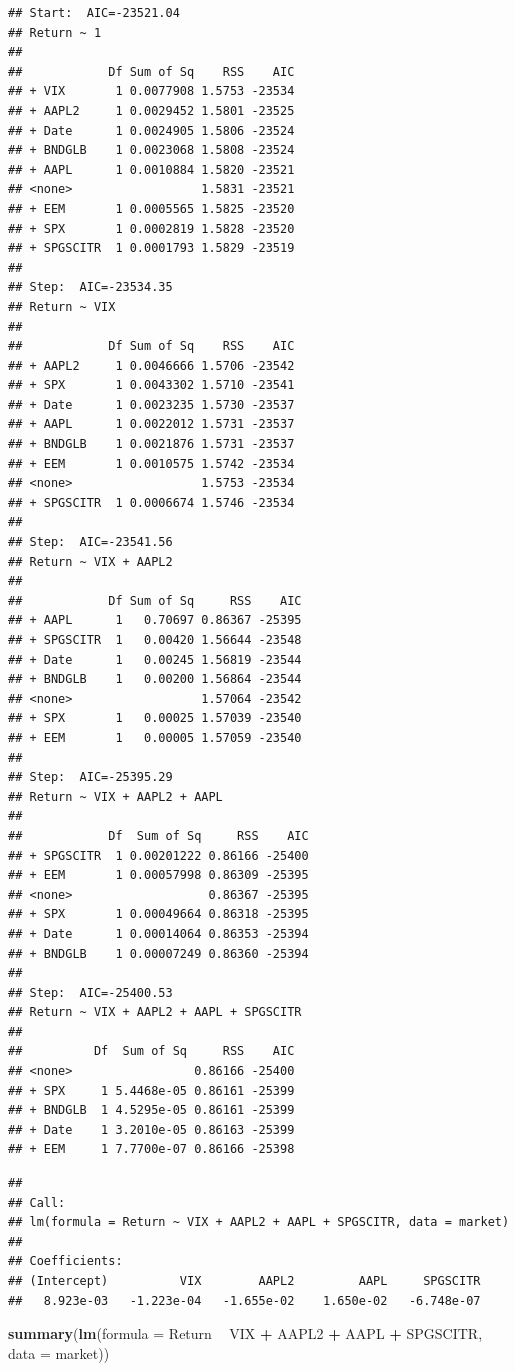 \documentclass[]{article}
\newenvironment{Shaded}{\begin{snugshade}}{\end{snugshade}}
\newcommand{\KeywordTok}[1]{\textcolor[rgb]{0.13,0.29,0.53}{\textbf{#1}}}
\newcommand{\DataTypeTok}[1]{\textcolor[rgb]{0.13,0.29,0.53}{#1}}
\newcommand{\StringTok}[1]{\textcolor[rgb]{0.31,0.60,0.02}{#1}}
\newcommand{\OperatorTok}[1]{\textcolor[rgb]{0.81,0.36,0.00}{\textbf{#1}}}
\newcommand{\NormalTok}[1]{#1}
\begin{document}
\begin{verbatim}
## Start:  AIC=-23521.04
## Return ~ 1
## 
##            Df Sum of Sq    RSS    AIC
## + VIX       1 0.0077908 1.5753 -23534
## + AAPL2     1 0.0029452 1.5801 -23525
## + Date      1 0.0024905 1.5806 -23524
## + BNDGLB    1 0.0023068 1.5808 -23524
## + AAPL      1 0.0010884 1.5820 -23521
## <none>                  1.5831 -23521
## + EEM       1 0.0005565 1.5825 -23520
## + SPX       1 0.0002819 1.5828 -23520
## + SPGSCITR  1 0.0001793 1.5829 -23519
## 
## Step:  AIC=-23534.35
## Return ~ VIX
## 
##            Df Sum of Sq    RSS    AIC
## + AAPL2     1 0.0046666 1.5706 -23542
## + SPX       1 0.0043302 1.5710 -23541
## + Date      1 0.0023235 1.5730 -23537
## + AAPL      1 0.0022012 1.5731 -23537
## + BNDGLB    1 0.0021876 1.5731 -23537
## + EEM       1 0.0010575 1.5742 -23534
## <none>                  1.5753 -23534
## + SPGSCITR  1 0.0006674 1.5746 -23534
## 
## Step:  AIC=-23541.56
## Return ~ VIX + AAPL2
## 
##            Df Sum of Sq     RSS    AIC
## + AAPL      1   0.70697 0.86367 -25395
## + SPGSCITR  1   0.00420 1.56644 -23548
## + Date      1   0.00245 1.56819 -23544
## + BNDGLB    1   0.00200 1.56864 -23544
## <none>                  1.57064 -23542
## + SPX       1   0.00025 1.57039 -23540
## + EEM       1   0.00005 1.57059 -23540
## 
## Step:  AIC=-25395.29
## Return ~ VIX + AAPL2 + AAPL
## 
##            Df  Sum of Sq     RSS    AIC
## + SPGSCITR  1 0.00201222 0.86166 -25400
## + EEM       1 0.00057998 0.86309 -25395
## <none>                   0.86367 -25395
## + SPX       1 0.00049664 0.86318 -25395
## + Date      1 0.00014064 0.86353 -25394
## + BNDGLB    1 0.00007249 0.86360 -25394
## 
## Step:  AIC=-25400.53
## Return ~ VIX + AAPL2 + AAPL + SPGSCITR
## 
##          Df  Sum of Sq     RSS    AIC
## <none>                 0.86166 -25400
## + SPX     1 5.4468e-05 0.86161 -25399
## + BNDGLB  1 4.5295e-05 0.86161 -25399
## + Date    1 3.2010e-05 0.86163 -25399
## + EEM     1 7.7700e-07 0.86166 -25398
\end{verbatim}

\begin{verbatim}
## 
## Call:
## lm(formula = Return ~ VIX + AAPL2 + AAPL + SPGSCITR, data = market)
## 
## Coefficients:
## (Intercept)          VIX        AAPL2         AAPL     SPGSCITR  
##   8.923e-03   -1.223e-04   -1.655e-02    1.650e-02   -6.748e-07
\end{verbatim}

\begin{Shaded}
\begin{Highlighting}[]
\KeywordTok{summary}\NormalTok{(}\KeywordTok{lm}\NormalTok{(}\DataTypeTok{formula =}\NormalTok{ Return }\OperatorTok{~}\StringTok{ }\NormalTok{VIX }\OperatorTok{+}\StringTok{ }\NormalTok{AAPL2 }\OperatorTok{+}\StringTok{ }\NormalTok{AAPL }\OperatorTok{+}\StringTok{ }\NormalTok{SPGSCITR, }\DataTypeTok{data =}\NormalTok{ market))}
\end{Highlighting}
\end{Shaded}
\end{document}
